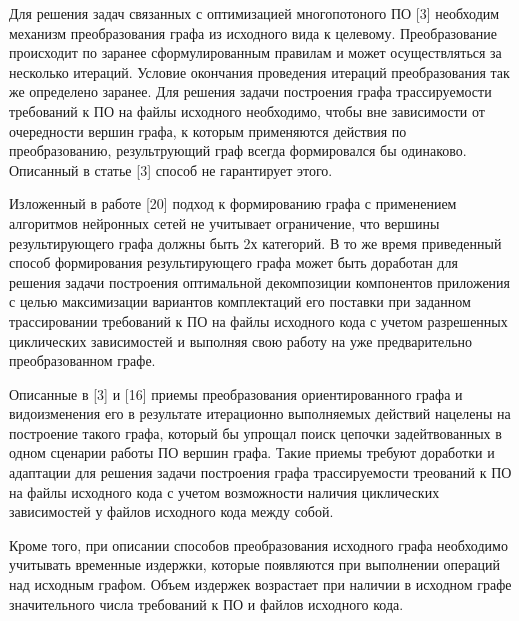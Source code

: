 Для решения задач связанных с оптимизацией многопотоного ПО [3] необходим механизм преобразования графа из исходного вида к целевому. Преобразование происходит по заранее сформулированным правилам и может осуществляться за несколько итераций. Условие окончания проведения итераций преобразования так же определено заранее. Для решения задачи построения графа трассируемости требований к ПО на файлы исходного необходимо, чтобы вне зависимости от очередности вершин графа, к которым применяются действия по преобразованию, результрующий граф всегда формировался бы одинаково. Описанный в статье [3] способ не гарантирует этого. 

Изложенный в работе [20] подход к формированию графа с применением алгоритмов нейронных сетей не учитывает ограничение, что вершины результирующего графа должны быть 2х категорий. В то же время приведенный способ формирования результирующего графа может быть доработан для решения задачи построения оптимальной декомпозиции компонентов приложения с целью максимизации вариантов комплектаций его поставки при заданном трассировании требований к ПО на файлы исходного кода с учетом разрешенных циклических зависимостей и выполняя свою работу на уже предварительно преобразованном графе.

Описанные в [3] и [16] приемы преобразования ориентированного графа и видоизменения его в результате итерационно выполняемых действий нацелены на построение такого графа, который бы упрощал поиск цепочки задейтвованных в одном сценарии работы ПО вершин графа. Такие приемы требуют доработки и адаптации для решения задачи построения графа трассируемости треований к ПО на файлы исходного кода с учетом возможности наличия циклических зависимостей у файлов исходного кода между собой.

Кроме того, при описании способов преобразования исходного графа необходимо учитывать временные издержки, которые появляются при выполнении операций над исходным графом. Объем издержек возрастает при наличии в исходном графе значительного числа требований к ПО и файлов исходного кода.
